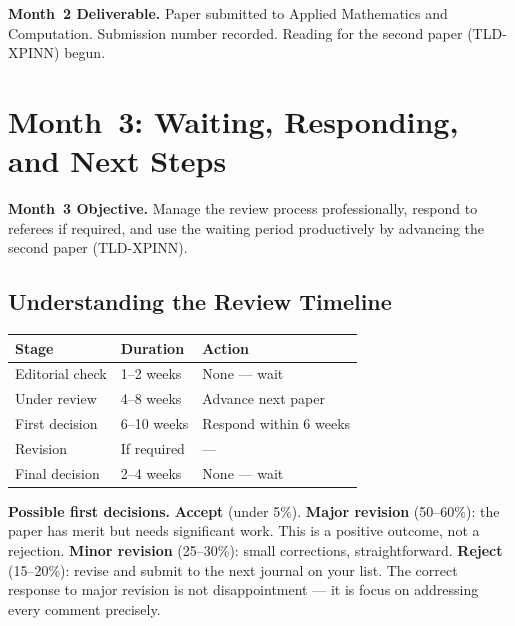 \documentclass[12pt,a4paper]{article}
\begin{document}
\begin{tcolorbox}[deliverablestyle]
\noindent\textbf{\color{darkgreen}Month~2 Deliverable.}
Paper submitted to Applied Mathematics and Computation.
Submission number recorded.
Reading for the second paper (TLD-XPINN) begun.
\end{tcolorbox}

\newpage
\section{Month~3: Waiting, Responding, and Next Steps}

\begin{tcolorbox}[infostyle]
\noindent\textbf{Month~3 Objective.}
Manage the review process professionally, respond to
referees if required, and use the waiting period
productively by advancing the second paper (TLD-XPINN).
\end{tcolorbox}

\subsection{Understanding the Review Timeline}

\begin{center}
\begin{tabular}{p{3.8cm} p{3cm} p{5.5cm}}
\toprule
\textbf{Stage} & \textbf{Duration} & \textbf{Action} \\
\midrule
Editorial check  & 1--2 weeks  & None --- wait \\
Under review     & 4--8 weeks  & Advance next paper \\
First decision   & 6--10 weeks & Respond within 6 weeks \\
Revision         & If required & --- \\
Final decision   & 2--4 weeks  & None --- wait \\
\bottomrule
\end{tabular}
\end{center}

\vspace{0.5em}
\begin{tcolorbox}[infostyle]
\noindent\textbf{Possible first decisions.}
\textbf{Accept} (under 5\%).
\textbf{Major revision} (50--60\%): the paper has merit
but needs significant work. This is a positive outcome,
not a rejection.
\textbf{Minor revision} (25--30\%): small corrections,
straightforward.
\textbf{Reject} (15--20\%): revise and submit to the next
journal on your list.
The correct response to major revision is not
disappointment --- it is focus on addressing every comment
precisely.
\end{tcolorbox}
\end{document}
